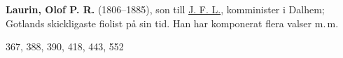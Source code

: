 \textbf{Laurin, Olof P. R.} (1806--1885), son till \href{Laurin-J-F}{J. F. L.}, komminister i Dalhem; Gotlands skickligaste fiolist på sin tid. Han har komponerat flera valser m.\,m. 

367, 388, 390, 418, 443, 552 
